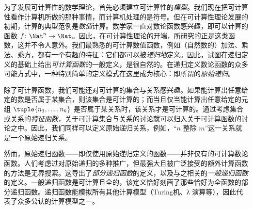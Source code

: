 \documentclass[../../../include/open-logic-section]{subfiles}
\begin{document}


为了发展可计算性的数学理论，首先必须建立可计算性的\emph{模型}。我们现在把可计算性看作计算机所做的那种事情，而计算机处理的是符号。但在可计算性理论发展的初期，计算的典型范例是\emph{数值}计算。数学家一直对数论函数感兴趣，即可以计算的函数 $f\colon \Nat^n \to \Nat$。因此，在可计算性理论的开端，所研究的正是这类函数，这并不令人意外。我们最熟悉的可计算数值函数，例如（自然数的）加法、乘法、乘方，都有一个有趣的特征：它们都可以被\emph{递归地}定义。因此，试图在递归定义的基础上给出\emph{可计算函数}的一般定义，是很自然的。在递归定义数论函数的众多可能方式中，一种特别简单的定义模式在这里成为核心：即所谓的\emph{原始递归}。

除了可计算函数，我们可能还对可计算的集合与关系感兴趣。如果能计算出任意给定的数是否属于某集合，则该集合是可计算的；而当且仅当能计算出任意给定的元组 $\tuple{n_1, \dots, n_k}$ 是否属于某关系时，该关系才是可计算的。通过考虑集合或关系的\emph{特征函数}，关于可计算集合与关系的讨论就可以归入关于可计算函数的讨论之中。因此，我们同样可以定义原始递归关系，例如，“$n$ 整除 $m$”这一关系就是一个原始递归关系。

然而，原始递归函数——即仅使用原始递归定义的函数——并非仅有的可计算数论函数。人们考虑过对原始递归的多种推广，但最强大且被广泛接受的额外计算函数的方法是无界搜索。这导出了\emph{部分递归函数}的定义，以及与之相关的\emph{一般递归函数}的定义。一般递归函数是可计算且全的，该定义恰好刻画了那些恰好为全函数的部分递归函数。递归函数能模拟所有其他计算模型（Turing机、λ 演算等），因此代表了众多公认的计算模型之一。
\end{document}
